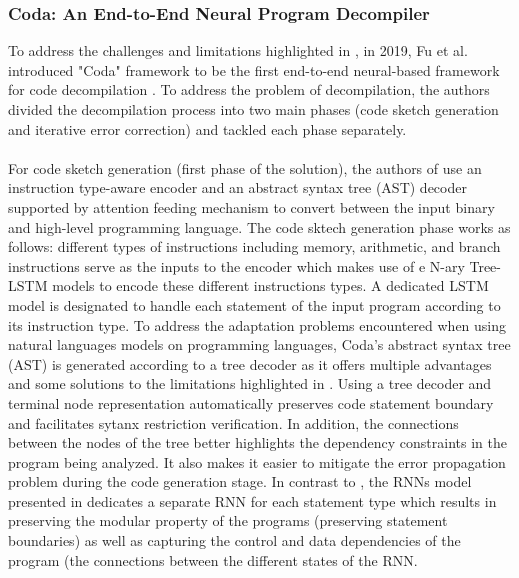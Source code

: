 \documentclass[conference,a4paper]{IEEEtran}
\begin{document}
\subsubsection{Coda: An End-to-End Neural Program Decompiler}
\noindent To address the challenges and limitations highlighted in \cite{fu_neural-based_2019}, in 2019, Fu et al. introduced "Coda" framework to be the first end-to-end neural-based framework for code decompilation \cite{fu_neural-based_2019}. To address the problem of decompilation, the authors divided the decompilation process into two main phases (code sketch generation and iterative error correction) and tackled each phase separately.\\\\
For code sketch generation (first phase of the solution), the authors of \cite{fu_neural-based_2019} use an instruction type-aware encoder and an abstract syntax tree (AST) decoder supported by attention feeding mechanism to convert between the input binary and high-level programming language.  The code sktech generation phase works as follows: different types of instructions including memory, arithmetic, and branch instructions serve as the inputs to the encoder which makes use of e N-ary Tree-LSTM models to encode these different instructions types. A dedicated LSTM model is designated to handle each statement of the input program according to its instruction type. To address the adaptation problems encountered when using natural languages models on programming languages, Coda's abstract syntax tree (AST) is generated according to a tree decoder as it offers multiple advantages and some solutions to the limitations highlighted in \cite{katz_using_2018}. Using a tree decoder and terminal node representation automatically preserves code statement boundary and facilitates sytanx restriction verification. In addition, the connections between the nodes of the tree better highlights the dependency constraints in the program being analyzed. It also makes it easier to mitigate the error propagation problem during the code generation stage. In contrast to \cite{katz_using_2018}, the RNNs model presented in \cite{fu_neural-based_2019} dedicates a separate RNN for each statement type which results in preserving the modular property of the programs (preserving statement boundaries) as well as capturing the control and data dependencies of the program (the connections between the different states of the RNN.  \\\\
\end{document}
